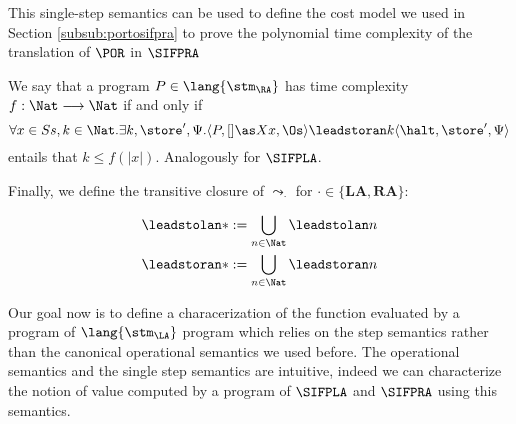 This single-step semantics can be used to define the cost model we used in Section
\ref{subsub:portosifpra} to prove the polynomial time complexity
of the translation of $\POR$ in $\SIFPRA$

\begin{defn}
  \label{def:sifpcost}
  We say that a program $P \in \lang{\stm_\RA}$
  has time complexity $f: \Nat \longrightarrow \Nat$ if and only if
  $$
  \forall x\in Ss, k \in \Nat. \exists k, \store', \Psi.
  \langle P, []\as X x, \Os\rangle \leadstoran k
  \langle\halt, \store', \Psi\rangle
  $$
  entails that $k \le f(|x|)$. Analogously for $\SIFPLA$.
\end{defn}

Finally, we define the transitive closure of $\leadsto_\cdot$ for $\cdot \in
\{\mathbf{LA}, \mathbf{RA}\}$:

\begin{defn}

  \begin{align*}
    \leadstolan * &:= \bigcup_{n \in \Nat} \leadstolan n\\
    \leadstoran * &:= \bigcup_{n \in \Nat} \leadstoran n\\
  \end{align*}

\end{defn}

Our goal now is to define a characerization of the function evaluated by a
program of $\lang {\stm_\LA}$ program which relies on the
step semantics rather than the
canonical operational semantics we used before.
%
The operational semantics and the single step semantics are intuitive, indeed
we can characterize the notion of value computed by a program of $\SIFPLA$ and
$\SIFPRA$ using this semantics.

